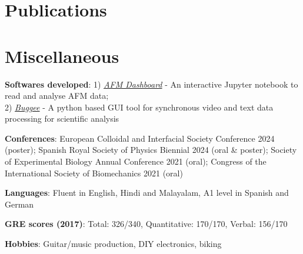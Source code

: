 \documentclass[letterpaper,11pt]{article}
\newcommand{\resumeItem}[1]{
	\item\small{
		{#1 \vspace{-2pt}}
	}
}
\newcommand{\resumeSubHeadingListStart}{\begin{itemize}[leftmargin=0.15in, label={}]}
\newcommand{\resumeSubHeadingListEnd}{\end{itemize}}
\begin{document}
	
	\section{Publications}
	\begin{refsection}
		\nocite{*} %
		\printbibliography[heading=none] %
	\end{refsection}
	


\section{Miscellaneous}
\vspace{4pt}
\begin{itemize}[leftmargin=0.15in, label={}]
	\small{\item{
			\textbf{Softwares developed}{: 1) \emph{\href{https://github.com/PranavSudersan/AFM-Dashboard}{AFM Dashboard}} - An interactive Jupyter notebook to read and analyse AFM data; \\ 2) \emph{\href{https://github.com/PranavSudersan/Buggee}{Buggee}} - A python based GUI tool for synchronous video and text data processing for scientific analysis}} \vspace{-4pt}
			\item{\textbf{Conferences}{: European Colloidal and Interfacial Society Conference 2024 (poster); Spanish Royal Society of Physics Biennial 2024 (oral \& poster); Society of Experimental Biology Annual Conference 2021 (oral); Congress of the International Society of Biomechanics 2021 (oral)}} \vspace{-4pt}
			\item{\textbf{Languages}{: Fluent in English, Hindi and Malayalam, A1 level in Spanish and German} \vspace{-4pt}
			\item{\textbf{GRE scores (2017)}{: Total: 326/340, Quantitative: 170/170, Verbal: 156/170}} \vspace{-4pt}
			\item{\textbf{Hobbies}{: Guitar/music production, DIY electronics, biking}}
	}}
\end{itemize}
\end{document}
